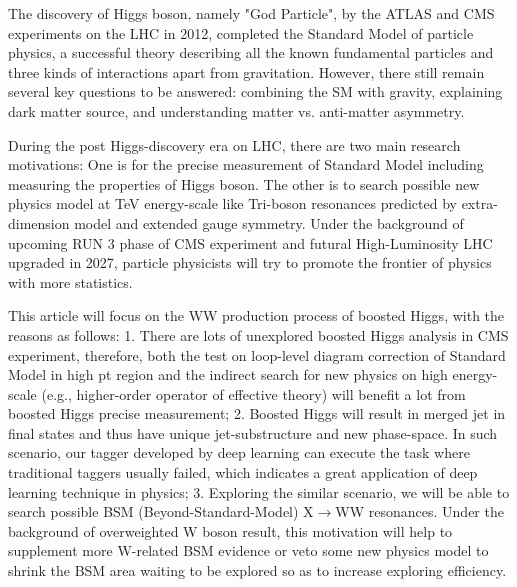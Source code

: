 \begin{eabstract}

    The discovery of Higgs boson, namely "God Particle", by the ATLAS and CMS experiments on the LHC in 2012, completed the Standard Model of particle physics, a successful theory describing all the known fundamental particles and three kinds of interactions apart from gravitation. However, there still remain several key questions to be answered: combining the SM with gravity, explaining dark matter source, and understanding matter vs. anti-matter asymmetry.
    
    During the post Higgs-discovery era on LHC, there are two main research motivations: One is for the precise measurement of Standard Model including measuring the properties of Higgs boson. The other is to search possible new physics model at TeV energy-scale like Tri-boson resonances predicted by extra-dimension model and extended gauge symmetry. Under the background of upcoming RUN 3 phase of CMS experiment and futural High-Luminosity LHC upgraded in 2027, particle physicists will try to promote the frontier of physics with more statistics.
    
    This article will focus on the WW production process of boosted Higgs, with the reasons as follows: 1. There are lots of unexplored boosted Higgs analysis in CMS experiment, therefore, both the test on loop-level diagram correction of Standard Model in high pt region and the indirect search for new physics on high energy-scale (e.g., higher-order operator of effective theory) will benefit a lot from boosted Higgs precise measurement; 2. Boosted Higgs will result in merged jet in final states and thus have unique jet-substructure and new phase-space. In such scenario, our tagger developed by deep learning can execute the task where traditional taggers usually failed, which indicates a great application of deep learning technique in physics; 3. Exploring the similar scenario, we will be able to search possible BSM (Beyond-Standard-Model) X$\to$WW resonances. Under the background of overweighted W boson result, this motivation will help to supplement more W-related BSM evidence or veto some new physics model to shrink the BSM area waiting to be explored so as to increase exploring efficiency.
    

\end{eabstract}
